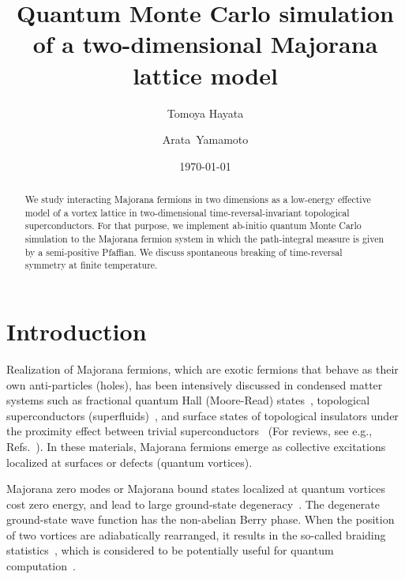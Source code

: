 \documentclass[aps,prb,superscriptaddress,twocolumn]{revtex4-1}
\begin{document}
\title{Quantum Monte Carlo simulation of a two-dimensional Majorana lattice model}

\author{Tomoya Hayata}
\author{Arata~Yamamoto}

\date{\today}

\begin{abstract}
We study interacting Majorana fermions in two dimensions as a low-energy effective model of a vortex lattice in two-dimensional time-reversal-invariant topological superconductors.
For that purpose, we implement ab-initio quantum Monte Carlo simulation to the Majorana fermion system in which the path-integral measure is given by a semi-positive Pfaffian.
We discuss spontaneous breaking of time-reversal symmetry at finite temperature.
\end{abstract}

\maketitle

\section{Introduction}
Realization of Majorana fermions, which are exotic fermions that behave as their own anti-particles (holes), 
has been intensively discussed in condensed matter systems such as fractional quantum Hall (Moore-Read) states~\cite{MOORE1991362}, 
topological superconductors (superfluids)~\cite{PhysRevB.61.10267,PhysRevLett.86.268,PhysRevB.78.195125,PhysRevLett.102.187001}, 
and surface states of topological insulators under the proximity effect between trivial superconductors~\cite{PhysRevLett.100.096407} (For reviews, see e.g., Refs.~\cite{RevModPhys.82.3045,RevModPhys.83.1057,JPSJ.85.022001}).
In these materials, Majorana fermions emerge as collective excitations localized at surfaces or defects (quantum vortices).

Majorana zero modes or Majorana bound states localized at quantum vortices cost zero energy, 
and lead to large ground-state degeneracy~\cite{MOORE1991362,PhysRevB.61.10267,PhysRevLett.86.268}.
The degenerate ground-state wave function has the non-abelian Berry phase.
When the position of two vortices are adiabatically rearranged, it results in the so-called braiding statistics~\cite{NAYAK1996529}, which is considered to be potentially useful for quantum computation~\cite{Kitaev20032,1063-7869-44-10S-S29,RevModPhys.80.1083}.
\end{document}
